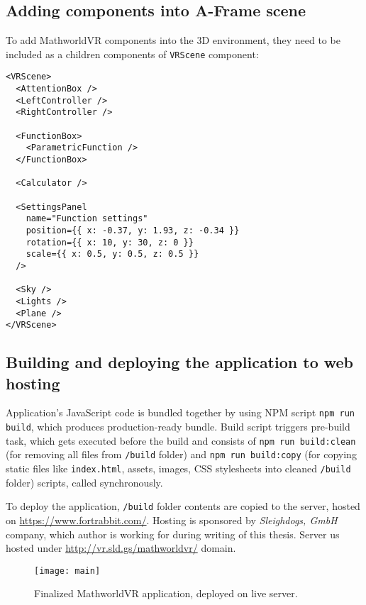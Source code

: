 \subsection{Adding components into A-Frame scene}
To add MathworldVR components into the 3D environment, they need to be included as a children components of \texttt{VRScene} component:

\begin{lstlisting}
<VRScene>
  <AttentionBox />
  <LeftController />
  <RightController />

  <FunctionBox>
    <ParametricFunction />
  </FunctionBox>

  <Calculator />

  <SettingsPanel
    name="Function settings"
    position={{ x: -0.37, y: 1.93, z: -0.34 }}
    rotation={{ x: 10, y: 30, z: 0 }}
    scale={{ x: 0.5, y: 0.5, z: 0.5 }}
  />

  <Sky />
  <Lights />
  <Plane />
</VRScene>
\end{lstlisting}

\subsection{Building and deploying the application to web hosting}
Application's JavaScript code is bundled together by using NPM script \texttt{npm run build}, which produces production-ready bundle. Build script triggers pre-build task, which gets executed before the build and consists of  \texttt{npm run build:clean} (for removing all files from \texttt{/build} folder) and \texttt{npm run build:copy} (for copying static files like \texttt{index.html}, assets, images, CSS stylesheets into cleaned \texttt{/build} folder) scripts, called synchronously.

To deploy the application, \texttt{/build} folder contents are copied to the server, hosted on \url{https://www.fortrabbit.com/}. Hosting is sponsored by \textsl{Sleighdogs, GmbH} company, which author is working for during writing of this thesis. Server us hosted under \url{http://vr.sld.gs/mathworldvr/} domain.

\newpage

\begin{figure}[ht!]
\centering
\texttt{[image: main]}
\caption{Finalized MathworldVR application, deployed on live server.}
\label{r:69}
\end{figure}

